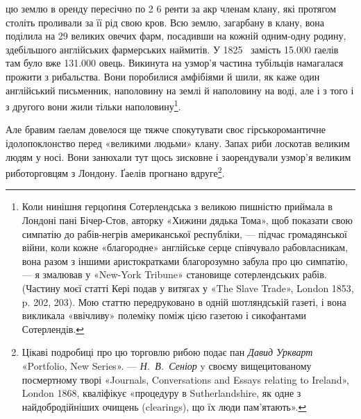 цю землю в оренду пересічно по 2 6 ренти за акр
членам клану, які протягом століть проливали за її рід свою кров.
Всю землю, загарбану в клану, вона поділила на 29 великих
овечих фарм, посадивши на кожній одним-одну родину, здебільшого
англійських фармерських наймитів. У 1825~ замість
\num{15.000} ґаелів там було вже \num{131.000} овець. Викинута на узмор’я
частина тубільців намагалася прожити з рибальства. Вони поробилися
амфібіями й шили, як каже один англійський письменник,
наполовину на землі й наполовину на воді, але і з того
і з другого вони жили тільки наполовину\footnote{
Коли нинішня герцоґиня Сотерлендська з великою пишністю
приймала в Лондоні пані Бічер-Стов, авторку «Хижини дядька Тома»,
щоб показати свою симпатію до рабів-негрів американської республіки, —
підчас громадянської війни, коли кожне «благородне» англійське серце
співчувало рабовласникам, вона разом з іншими аристократками благорозумно
забула про цю симпатію, — я змалював у «New-York Tribune»
становище сотерлендських рабів. (Частину моєї статті Кері подав у витягах
у «The Slave Trade», London 1853, p. 202, 203). Мою статтю передруковано
в одній шотляндській газеті, і вона викликала «ввічливу» полеміку
поміж цією газетою і сикофантами Сотерлендів.
}.

Але бравим ґаелам довелося ще тяжче спокутувати своє гірсько\dash{}романтичне
ідолопоклонство перед «великими людьми»
клану. Запах риби лоскотав великим людям у носі. Вони занюхали
тут щось зисковне і заорендували узмор’я великим риботорговцям
з Лондону. Ґаелів прогнано вдруге\footnote{
Цікаві подробиці про цю торговлю рибою подає пан \emph{Давид Уркварт}
«Portfolio, New Series». — \emph{Н.~В.~Сеніор} y своєму вищецитованому посмертному
творі «Journals, Conversations and Essays relating to Ireland»,
London 1868, кваліфікує «процедуру в Sutherlandshire, як одне з найдобродійніших
очищень (clearings), що їх люди пам’ятають».
}.

